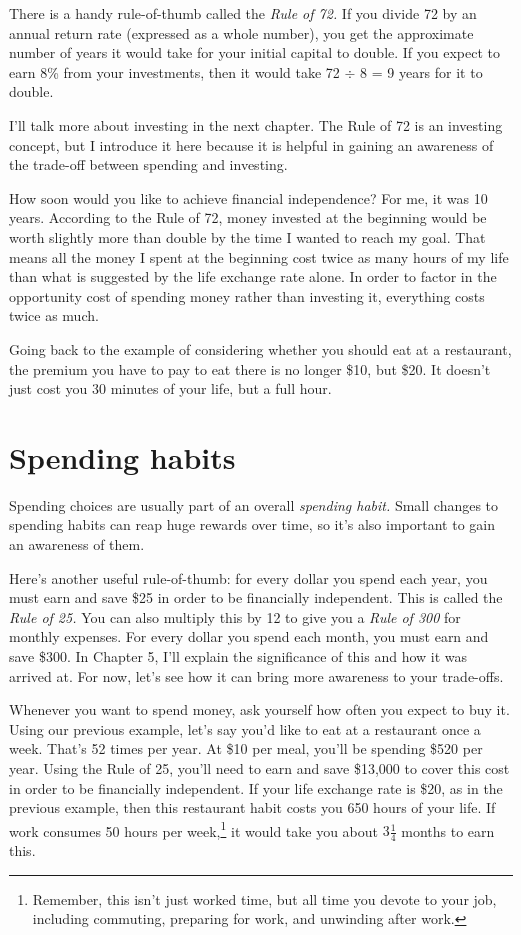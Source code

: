 There is a handy rule-of-thumb called the \emph{Rule of 72.} If you divide 72 by an annual return rate (expressed as a whole number), you get the approximate number of years it would take for your initial capital to double. If you expect to earn 8\% from your investments, then it would take 72 $\div$ 8 = 9 years for it to double.

I'll talk more about investing in the next chapter. The Rule of 72 is an investing concept, but I introduce it here because it is helpful in gaining an awareness of the trade-off between spending and investing.

How soon would you like to achieve financial independence? For me, it was 10 years. According to the Rule of 72, money invested at the beginning would be worth slightly more than double by the time I wanted to reach my goal. That means all the money I spent at the beginning cost twice as many hours of my life than what is suggested by the life exchange rate alone. In order to factor in the opportunity cost of spending money rather than investing it, everything costs twice as much.

Going back to the example of considering whether you should eat at a restaurant, the premium you have to pay to eat there is no longer \$10, but \$20. It doesn't just cost you 30 minutes of your life, but a full hour.

\section{Spending habits}
Spending choices are usually part of an overall \emph{spending habit.} Small changes to spending habits can reap huge rewards over time, so it's also important to gain an awareness of them.

Here's another useful rule-of-thumb: for every dollar you spend each year, you must earn and save \$25 in order to be financially independent. This is called the \emph{Rule of 25.} You can also multiply this by 12 to give you a \emph{Rule of 300} for monthly expenses. For every dollar you spend each month, you must earn and save \$300. In Chapter 5, I'll explain the significance of this and how it was arrived at. For now, let's see how it can bring more awareness to your trade-offs.

Whenever you want to spend money, ask yourself how often you expect to buy it. Using our previous example, let's say you'd like to eat at a restaurant once a week. That's 52 times per year. At \$10 per meal, you'll be spending \$520 per year. Using the Rule of 25, you'll need to earn and save \$13,000 to cover this cost in order to be financially independent. If your life exchange rate is \$20, as in the previous example, then this restaurant habit costs you 650 hours of your life. If work consumes 50 hours per week,\footnote{Remember, this isn't just worked time, but all time you devote to your job, including commuting, preparing for work, and unwinding after work.} it would take you about $3\frac{1}{4}$ months to earn this.

